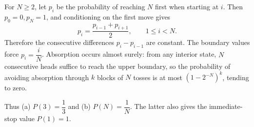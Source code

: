 For $N\ge2$, let $p_i$ be the probability of reaching $N$ first when starting at $i$. Then $p_0=0,p_N=1$, and conditioning on the first move gives
\[
p_i=\dfrac{p_{i-1}+p_{i+1}}{2},\qquad1\le i<N.
\]
Therefore the consecutive differences $p_i-p_{i-1}$ are constant. The boundary values force $p_i=\dfrac{i}{N}$. Absorption occurs almost surely: from any interior state, $N$ consecutive heads suffice to reach the upper boundary, so the probability of avoiding absorption through $k$ blocks of $N$ tosses is at most $(1-2^{-N})^k$, tending to zero.

Thus (a) $\boxed{P(3)=\dfrac{1}{3}}$ and (b) $\boxed{P(N)=\dfrac{1}{N}}$. The latter also gives the immediate-stop value $P(1)=1$.
